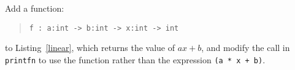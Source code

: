 \label{linearFct} Add a function:
  \begin{quote}
    \mbox{\lstinline!f : a:int -> b:int -> x:int -> int!}
  \end{quote}
to Listing~\ref{linear}, which returns the value of $ax+b$, and modify
the call in \lstinline!printfn! to use the function rather than the expression \lstinline!(a * x + b)!.
